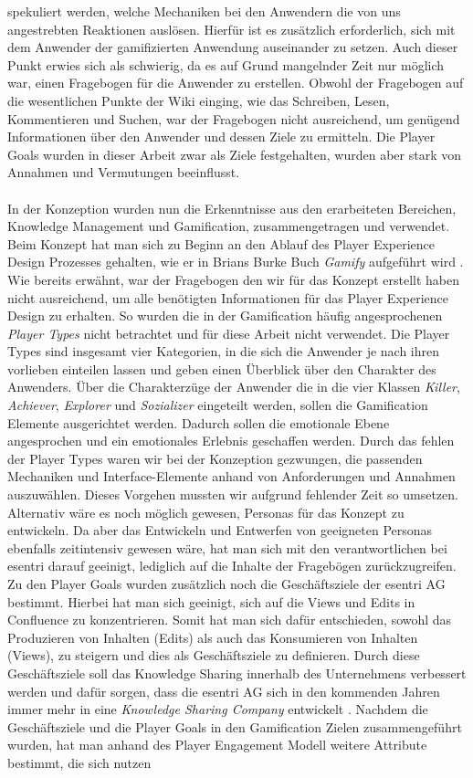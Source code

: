 \documentclass[a4paper,12pt,twoside]{scrartcl}
\begin{document}
spekuliert werden, welche Mechaniken bei den Anwendern die von uns angestrebten Reaktionen auslösen. Hierfür ist es zusätzlich erforderlich, sich mit dem Anwender der gamifizierten Anwendung auseinander zu setzen. Auch dieser Punkt erwies sich als schwierig, da es auf Grund mangelnder Zeit nur möglich war, einen Fragebogen für die Anwender zu erstellen. Obwohl der Fragebogen auf die wesentlichen Punkte der Wiki einging, wie das Schreiben, Lesen, Kommentieren und Suchen, war der Fragebogen nicht ausreichend, um genügend Informationen über den Anwender und dessen Ziele zu ermitteln. Die Player Goals wurden in dieser Arbeit zwar als Ziele festgehalten, wurden aber stark von Annahmen und Vermutungen beeinflusst. 
\\\\
In der Konzeption wurden nun die Erkenntnisse aus den erarbeiteten Bereichen, Knowledge Management und Gamification, zusammengetragen und verwendet. Beim Konzept hat man sich zu Beginn an den Ablauf des Player Experience Design Prozesses gehalten, wie er in Brians Burke Buch \textit{Gamify} aufgeführt wird \cite{gamificationDefinition}. Wie bereits erwähnt, war der Fragebogen den wir für das Konzept erstellt haben nicht ausreichend, um alle benötigten Informationen für das Player Experience Design zu erhalten. So wurden die in der Gamification häufig angesprochenen \textit{Player Types} nicht betrachtet und für diese Arbeit nicht verwendet. Die Player Types sind insgesamt vier Kategorien, in die sich die Anwender je nach ihren vorlieben einteilen lassen und geben einen Überblick über den Charakter des Anwenders. Über die Charakterzüge der Anwender die in die vier Klassen \textit{Killer}, \textit{Achiever}, \textit{Explorer} und \textit{Sozializer} eingeteilt werden, sollen die Gamification Elemente ausgerichtet werden. Dadurch sollen die emotionale Ebene angesprochen und ein emotionales Erlebnis geschaffen werden. Durch das fehlen der Player Types waren wir bei der Konzeption gezwungen, die passenden Mechaniken und Interface-Elemente anhand von Anforderungen und Annahmen auszuwählen. Dieses Vorgehen mussten wir aufgrund fehlender Zeit so umsetzen. Alternativ wäre es noch möglich gewesen, Personas für das Konzept zu entwickeln. Da aber das Entwickeln und Entwerfen von geeigneten Personas ebenfalls zeitintensiv gewesen wäre, hat man sich mit den verantwortlichen bei esentri darauf geeinigt, lediglich auf die Inhalte der Fragebögen zurückzugreifen. Zu den Player Goals wurden zusätzlich noch die Geschäftsziele der esentri AG bestimmt. Hierbei hat man sich geeinigt, sich auf die Views und Edits in Confluence zu konzentrieren. Somit hat man sich dafür entschieden, sowohl das Produzieren von Inhalten (Edits) als auch das Konsumieren von Inhalten (Views), zu steigern und dies als Geschäftsziele zu definieren. Durch diese Geschäftsziele soll das Knowledge Sharing innerhalb des Unternehmens verbessert werden und dafür sorgen, dass die esentri AG sich in den kommenden Jahren immer mehr in eine \textit{Knowledge Sharing Company} entwickelt \cite{Soulejman2016}. Nachdem die Geschäftsziele und die Player Goals in den Gamification Zielen zusammengeführt wurden, hat man anhand des Player Engagement Modell weitere Attribute bestimmt, die sich nutzen 
\end{document}
